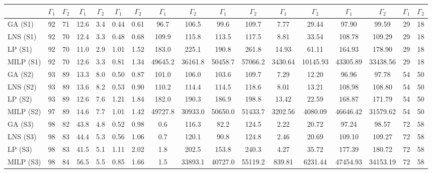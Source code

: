 \begin{table}[t]
\begin{tabular}{l| cc|cc|cc|cc|cc|cc|cc|cc}
\cmidrule(lr){2-17} 
 & $\Gamma_1$ & $\Gamma_2$ & $\Gamma_1$ & $\Gamma_2$ & $\Gamma_1$ & $\Gamma_2$ & $\Gamma_1$ & $\Gamma_2$ & $\Gamma_1$ & $\Gamma_2$ & $\Gamma_1$ & $\Gamma_2$ & $\Gamma_1$ & $\Gamma_2$ & $\Gamma_1$ & $\Gamma_2$ \\ 
\midrule
     GA (S1) & 92 & 71 & 12.6 & 3.4 & 0.44 & 0.61 & 96.7 & 106.5 & 99.6 & 109.7 & 7.77 & 29.44 & 97.90 & 99.59 & 29 & 18  \\
 LNS (S1) & 92 & 70 & 12.4 & 3.3 & 0.48 & 0.68 & 109.9 & 115.8 & 113.5 & 117.5 & 8.81 & 33.54 & 108.78 & 109.29 & 29 & 18  \\
 LP (S1) & 92 & 70 & 11.0 & 2.9 & 1.01 & 1.52 & 183.0 & 225.1 & 190.8 & 261.8 & 14.93 & 61.11 & 164.93 & 178.90 & 29 & 18  \\
 MILP (S1) & 92 & 70 & 12.6 & 3.3 & 0.81 & 1.34 & 49645.2 & 36161.8 & 50458.7 & 57066.2 & 3430.64 & 10145.93 & 43305.89 & 33438.56 & 29 & 18  \\
 GA (S2) & 93 & 89 & 13.3 & 8.0 & 0.50 & 0.87 & 101.0 & 106.0 & 103.6 & 109.7 & 7.29 & 12.20 & 96.96 & 97.78 & 54 & 50  \\
 LNS (S2) & 93 & 89 & 13.6 & 8.2 & 0.53 & 0.90 & 110.2 & 114.4 & 114.5 & 118.6 & 8.01 & 13.21 & 108.98 & 108.80 & 54 & 50  \\
 LP (S2) & 93 & 89 & 12.6 & 7.6 & 1.21 & 1.84 & 182.0 & 190.3 & 186.9 & 198.8 & 13.42 & 22.59 & 168.87 & 171.79 & 54 & 50  \\
 MILP (S2) & 97 & 89 & 14.6 & 7.7 & 1.01 & 1.42 & 49727.8 & 30933.0 & 50650.0 & 51433.7 & 3202.56 & 4080.09 & 46646.42 & 31579.62 & 54 & 50  \\
 GA (S3) & 98 & 82 & 43.8 & 4.8 & 0.52 & 0.98 & 0.6 & 116.3 & 82.2 & 124.5 & 2.22 & 20.72 & 97.24 & 98.57 & 72 & 58  \\
 LNS (S3) & 98 & 83 & 44.4 & 5.3 & 0.56 & 1.06 & 0.7 & 120.1 & 90.8 & 124.8 & 2.46 & 20.69 & 109.10 & 109.27 & 72 & 58  \\
 LP (S3) & 98 & 83 & 41.5 & 5.1 & 1.11 & 2.02 & 1.8 & 202.5 & 153.8 & 240.3 & 4.27 & 35.72 & 177.39 & 180.72 & 72 & 58  \\
 MILP (S3) & 98 & 84 & 56.5 & 5.5 & 0.85 & 1.66 & 1.5 & 33893.1 & 40727.0 & 55119.2 & 839.81 & 6231.44 & 47454.93 & 34153.19 & 72 & 58  \\
\bottomrule

\end{tabular}
\end{table}
